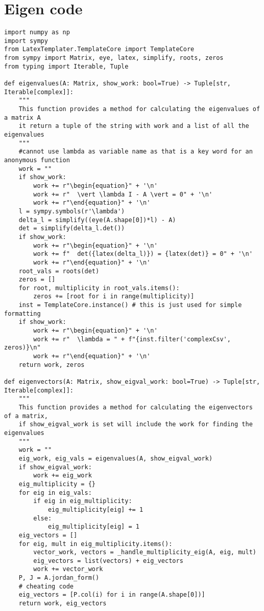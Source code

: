\appendix

\vspace{2cm}
\section{Eigen code} \label{appendix:eigen}
\begin{verbatim}
import numpy as np
import sympy
from LatexTemplater.TemplateCore import TemplateCore
from sympy import Matrix, eye, latex, simplify, roots, zeros
from typing import Iterable, Tuple

def eigenvalues(A: Matrix, show_work: bool=True) -> Tuple[str, Iterable[complex]]:
    """
    This function provides a method for calculating the eigenvalues of a matrix A
    it return a tuple of the string with work and a list of all the eigenvalues
    """
    #cannot use lambda as variable name as that is a key word for an anonymous function
    work = ""
    if show_work:
        work += r"\begin{equation}" + '\n'
        work += r"  \vert \lambda I - A \vert = 0" + '\n'
        work += r"\end{equation}" + '\n'
    l = sympy.symbols(r'\lambda')
    delta_l = simplify((eye(A.shape[0])*l) - A)
    det = simplify(delta_l.det())
    if show_work:
        work += r"\begin{equation}" + '\n'
        work += f"  det({latex(delta_l)}) = {latex(det)} = 0" + '\n'
        work += r"\end{equation}" + '\n'
    root_vals = roots(det)
    zeros = []
    for root, multiplicity in root_vals.items():
        zeros += [root for i in range(multiplicity)]
    inst = TemplateCore.instance() # this is just used for simple formatting
    if show_work:
        work += r"\begin{equation}" + '\n'
        work += r"  \lambda = " + f"{inst.filter('complexCsv', zeros)}\n"
        work += r"\end{equation}" + '\n'
    return work, zeros

def eigenvectors(A: Matrix, show_eigval_work: bool=True) -> Tuple[str, Iterable[complex]]:
    """
    This function provides a method for calculating the eigenvectors of a matrix,
    if show_eigval_work is set will include the work for finding the eigenvalues
    """
    work = ""
    eig_work, eig_vals = eigenvalues(A, show_eigval_work)
    if show_eigval_work:
        work += eig_work
    eig_multiplicity = {}
    for eig in eig_vals:
        if eig in eig_multiplicity:
            eig_multiplicity[eig] += 1
        else:
            eig_multiplicity[eig] = 1
    eig_vectors = []
    for eig, mult in eig_multiplicity.items():
        vector_work, vectors = _handle_multiplicity_eig(A, eig, mult)
        eig_vectors = list(vectors) + eig_vectors
        work += vector_work
    P, J = A.jordan_form()
    # cheating code
    eig_vectors = [P.col(i) for i in range(A.shape[0])]
    return work, eig_vectors


\end{verbatim}
